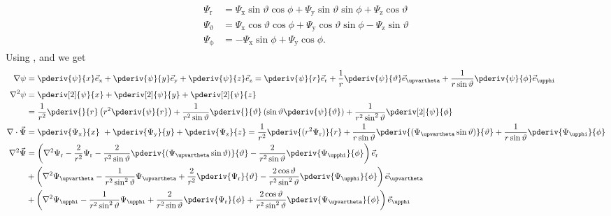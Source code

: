 \begin{align*}
\begin{split}
	\Psi_{\mathrm{r}} &= \Psi_{\mathrm{x}}\sin\vartheta\cos\phi + \Psi_{\mathrm{y}}\sin\vartheta\sin\phi + \Psi_{\mathrm{z}}\cos\vartheta\\
	\Psi_{\upvartheta} &= \Psi_{\mathrm{x}}\cos\vartheta\cos\phi + \Psi_{\mathrm{y}}\cos\vartheta\sin\phi - \Psi_{\mathrm{z}}\sin\vartheta\\
	\Psi_{\upphi} &= - \Psi_{\mathrm{x}}\sin\phi + \Psi_{\mathrm{y}}\cos\phi.
\end{split}
\end{align*}
Using ,  and  we get
\begin{align}
	\nabla\psi &= \pderiv{\psi}{x}\vec{e}_{\mathrm{x}} + \pderiv{\psi}{y}\vec{e}_{\mathrm{y}} + \pderiv{\psi}{z}\vec{e}_{\mathrm{z}} = \pderiv{\psi}{r}\vec{e}_{\mathrm{r}}+\frac{1}{r}\pderiv{\psi}{\vartheta}\vec{e}_{\upvartheta}+\frac{1}{r\sin\vartheta}\pderiv{\psi}{\phi}\vec{e}_{\upphi} \label{Eq2:delScalarSpherical} \\	
	\nabla^2\psi &= \pderiv[2]{\psi}{x} + \pderiv[2]{\psi}{y} + \pderiv[2]{\psi}{z}\\ 
	&= \frac{1}{r^2}\pderiv{}{r}\left(r^2\pderiv{\psi}{r}\right) + \frac{1}{r^2\sin\vartheta}\pderiv{}{\vartheta}\left(\sin\vartheta\pderiv{\psi}{\vartheta}\right) +\frac{1}{r^2\sin^2\vartheta}\pderiv[2]{\psi}{\phi}\\
	\nabla\cdot\vec{\Psi} &= \pderiv{\Psi_{\mathrm{x}}}{x}\ + \pderiv{\Psi_{\mathrm{y}}}{y} + \pderiv{\Psi_{\mathrm{z}}}{z} = \frac{1}{r^2}\pderiv{(r^2\Psi_{\mathrm{r}})}{r} + \frac{1}{r\sin\vartheta}\pderiv{(\Psi_{\upvartheta}\sin\vartheta)}{\vartheta}+\frac{1}{r\sin\vartheta}\pderiv{\Psi_{\upphi}}{\phi} \label{Eq2:DelDotVecSpherical} \\ 
	\nabla^2\vec{\Psi} &= \left(\nabla^2\Psi_{\mathrm{r}} - \frac{2}{r^2}\Psi_{\mathrm{r}}-\frac{2}{r^2\sin\vartheta}\pderiv{(\Psi_{\upvartheta}\sin\vartheta)}{\vartheta} -\frac{2}{r^2\sin\vartheta}\pderiv{\Psi_{\upphi}}{\phi}\right)\vec{e}_{\mathrm{r}} \\
	&+ \left(\nabla^2\Psi_{\upvartheta}-\frac{1}{r^2\sin^2\vartheta}\Psi_{\upvartheta} + \frac{2}{r^2}\pderiv{\Psi_{\mathrm{r}}}{\vartheta} -\frac{2\cos\vartheta}{r^2\sin^2\vartheta}\pderiv{\Psi_{\upphi}}{\phi}\right)\vec{e}_{\upvartheta} \\
	&+ \left(\nabla^2\Psi_{\upphi} - \frac{1}{r^2\sin^2\vartheta}\Psi_{\upphi} + \frac{2}{r^2\sin\vartheta}\pderiv{\Psi_{\mathrm{r}}}{\phi}+\frac{2\cos\vartheta}{r^2\sin^2\vartheta}\pderiv{\Psi_{\upvartheta}}{\phi}\right)\vec{e}_{\upphi} \label{Eq2:LapVecPotSpherical}
\end{align}
